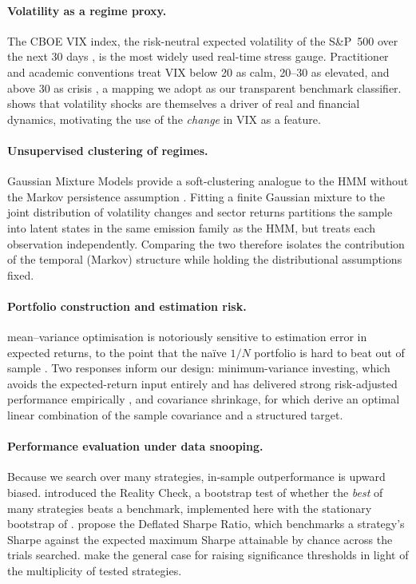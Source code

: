 \documentclass[12pt,a4paper]{article}
\begin{document}
\paragraph{Volatility as a regime proxy.}
The CBOE VIX index, the risk-neutral expected volatility of the S\&P~500 over the next 30
days \citep{whaley2009}, is the most widely used real-time stress gauge. Practitioner and
academic conventions treat VIX below 20 as calm, 20--30 as elevated, and above 30 as
crisis \citep{whaley2009, bloom2009}, a mapping we adopt as our transparent benchmark
classifier. \citet{bloom2009} shows that volatility shocks are themselves a driver of
real and financial dynamics, motivating the use of the \emph{change} in VIX as a feature.

\paragraph{Unsupervised clustering of regimes.}
Gaussian Mixture Models provide a soft-clustering analogue to the HMM without the Markov
persistence assumption \citep{mclachlan2000}. Fitting a finite Gaussian mixture to the
joint distribution of volatility changes and sector returns partitions the sample into
latent states in the same emission family as the HMM, but treats each observation
independently. Comparing the two therefore isolates the contribution of the temporal
(Markov) structure while holding the distributional assumptions fixed.

\paragraph{Portfolio construction and estimation risk.}
\citet{markowitz1952} mean--variance optimisation is notoriously sensitive to estimation
error in expected returns, to the point that the na\"ive $1/N$ portfolio is hard to beat
out of sample \citep{demiguel2009}. Two responses inform our design: minimum-variance
investing, which avoids the expected-return input entirely and has delivered strong
risk-adjusted performance empirically \citep{clarke2006}, and covariance shrinkage, for
which \citet{ledoit2004} derive an optimal linear combination of the sample covariance
and a structured target.

\paragraph{Performance evaluation under data snooping.}
Because we search over many strategies, in-sample outperformance is upward biased.
\citet{white2000} introduced the Reality Check, a bootstrap test of whether the
\emph{best} of many strategies beats a benchmark, implemented here with the stationary
bootstrap of \citet{politis1994}. \citet{bailey2014} propose the Deflated Sharpe Ratio,
which benchmarks a strategy's Sharpe against the expected maximum Sharpe attainable by
chance across the trials searched. \citet{harvey2016} make the general case for raising
significance thresholds in light of the multiplicity of tested strategies.
\end{document}
